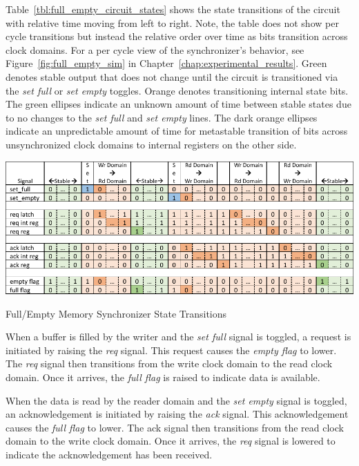         Table~\ref{tbl:full_empty_circuit_states} shows the state transitions of the circuit with relative time moving from left to right. Note, the table does not show per cycle transitions but instead the relative order over time as bits transition across clock domains. For a per cycle view of the synchronizer's behavior, see Figure~\ref{fig:full_empty_sim} in Chapter~\ref{chap:experimental_results}. Green denotes stable output that does not change until the circuit is transitioned via the {\it set full} or {\it set empty} toggles. Orange denotes transitioning internal state bits. The green ellipses indicate an unknown amount of time between stable states due to no changes to the {\it set full} and {\it set empty} lines. The dark orange ellipses indicate an unpredictable amount of time for metastable transition of bits across unsynchronized clock domains to internal registers on the other side.

        \begin{table}
            \centering
            \includegraphics[width=1.0\textwidth]{fig/full_empty_circuit_states.pdf}
            \caption{Full/Empty Memory Synchronizer State Transitions}
            \label{tbl:full_empty_circuit_states}
        \end{table}

        When a buffer is filled by the writer and the {\it set full} signal is toggled, a request is initiated by raising the {\it req} signal. This request causes the {\it empty flag} to lower. The {\it req} signal then transitions from the write clock domain to the read clock domain. Once it arrives, the {\it full flag} is raised to indicate data is available.

        When the data is read by the reader domain and the {\it set empty} signal is toggled, an acknowledgement is initiated by raising the {\it ack} signal. This acknowledgement causes the {\it full flag} to lower. The {ack} signal then transitions from the read clock domain to the write clock domain. Once it arrives, the {\it req} signal is lowered to indicate the acknowledgement has been received.

